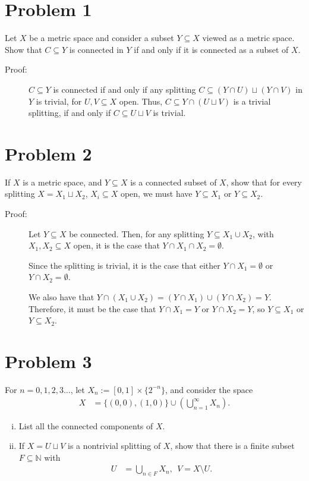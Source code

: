 \documentclass[8pt]{extarticle}
\title{}
\author{}
\date{}
\newcommand{\N}{\mathbb{N}}
\begin{document}
  \section{Problem 1}%
  Let $X$ be a metric space and consider a subset $Y\subseteq X$ viewed as a metric space. Show that $C\subseteq Y$ is connected in $Y$ if and only if it is connected as a subset of $X$.
  \begin{description}
    \item[Proof:] $C\subseteq Y$ is connected if and only if any splitting $C\subseteq (Y\cap U)\sqcup(Y\cap V)$ in $Y$ is trivial, for $U,V\subseteq X$ open. Thus, $C\subseteq Y\cap (U\sqcup V)$ is a trivial splitting, if and only if $C\subseteq U\sqcup V$ is trivial.
  \end{description}
  \section{Problem 2}%
  If $X$ is a metric space, and $Y\subseteq X$ is a connected subset of $X$, show that for every splitting $X = X_1\sqcup X_2$, $X_i\subseteq X$ open, we must have $Y\subseteq X_1$ or $Y\subseteq X_2$.
  \begin{description}
    \item[Proof:] Let $Y\subseteq X$ be connected. Then, for any splitting $Y\subseteq X_1\cup X_2$, with $X_1,X_2\subseteq X$ open, it is the case that $Y\cap X_1\cap X_2 = \emptyset$.

      Since the splitting is trivial, it is the case that either $Y\cap X_1 = \emptyset$ or $Y\cap X_2 = \emptyset$.

      We also have that $Y\cap (X_1 \cup X_2) = \left(Y\cap X_1\right) \cup \left(Y\cap X_2\right) = Y$. Therefore, it must be the case that $Y\cap X_1 = Y$ or $Y\cap X_2 = Y$, so $Y\subseteq X_1$ or $Y\subseteq X_2$.
  \end{description}
  \section{Problem 3}%
  For $n=0,1,2,3\dots$, let $X_n := [0,1]\times \{2^{-n}\}$, and consider the space
  \begin{align*}
    X &= \{(0,0),(1,0)\} \cup \left(\bigcup_{n=1}^{\infty} X_n\right).
  \end{align*}
  \begin{enumerate}[(i)]
    \item List all the connected components of $X$.
    \item If $X = U\sqcup V$ is a nontrivial splitting of $X$, show that there is a finite subset $F\subseteq \N$ with
      \begin{align*}
        U &= \bigcup_{n\in F}X_n,~~V = X\setminus U.
      \end{align*}
  \end{enumerate}
\end{document}
